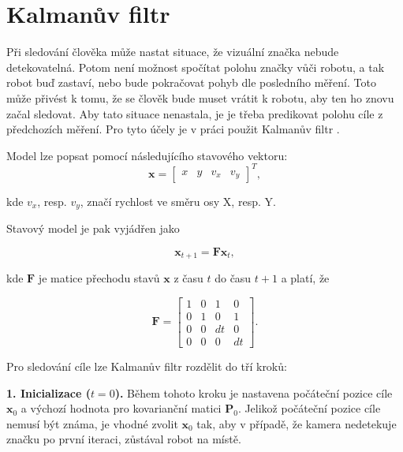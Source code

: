 \documentclass[twoside]{ctuthesis}
\theoremstyle{plain}
\theoremstyle{definition}
\theoremstyle{note}
\begin{document}
\section{Kalmanův filtr}
\label{kalman_section}



Při sledování člověka může nastat situace, že vizuální značka nebude detekovatelná. Potom není možnost spočítat polohu značky vůči robotu, a tak robot buď zastaví, nebo bude pokračovat pohyb dle posledního měření. Toto může přivést k tomu, že se člověk bude muset vrátit k robotu, aby ten ho znovu začal sledovat. Aby tato situace nenastala, je je třeba predikovat polohu cíle z předchozích měření. Pro tyto účely je v práci použit Kalmanův filtr \cite{cite:10}.

Model lze popsat pomocí následujícího stavového vektoru:
\begin{equation}
{\boldsymbol{x}} =
\begin{bmatrix}
x&y&v_{x}&v_{y}
\end{bmatrix}^T,
\end{equation}

kde $v_{x}$, resp. $v_{y}$, značí rychlost ve směru osy X, resp. Y.


Stavový model je pak vyjádřen jako

\begin{equation}
\label{x_t+1}
{\boldsymbol{x}}_{t+1} = \boldsymbol{F}{\boldsymbol{x}}_{t},
\end{equation}

kde $\boldsymbol{F}$ je matice přechodu stavů $\boldsymbol{x}$ z času $t$ do času $t + 1$ a platí, že

\begin{equation}
\boldsymbol{F} = \begin{bmatrix}
1&0&1&0\\
0&1&0&1\\
0&0&dt&0\\
0&0&0&dt
\end{bmatrix}.
\end{equation}

Pro sledování cíle lze Kalmanův filtr rozdělit do tří kroků:

\textbf{1.  Inicializace ($t = 0$).} Během tohoto kroku je nastavena počáteční pozice cíle $\boldsymbol{x}_0$ a výchozí hodnota pro kovarianční matici $\boldsymbol{P}_0$. Jelikož počáteční pozice cíle nemusí být známa, je vhodné zvolit $\boldsymbol{x}_0$ tak, aby v případě, že kamera nedetekuje značku po první iteraci, zůstával robot na místě.
\end{document}
